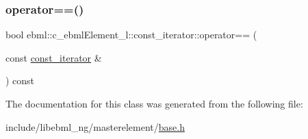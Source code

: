 \subsubsection{\texorpdfstring{operator==()}{operator==()}}
{\footnotesize\ttfamily bool ebml\+::c\+\_\+ebml\+Element\+\_\+l\+::const\+\_\+iterator\+::operator== (\begin{DoxyParamCaption}\item[{const \mbox{\hyperlink{classebml_1_1c__ebmlElement__l_1_1const__iterator}{const\+\_\+iterator}} \&}]{ }\end{DoxyParamCaption}) const}



The documentation for this class was generated from the following file\+:\begin{DoxyCompactItemize}
\item 
include/libebml\+\_\+ng/masterelement/\mbox{\hyperlink{base_8h}{base.\+h}}\end{DoxyCompactItemize}
